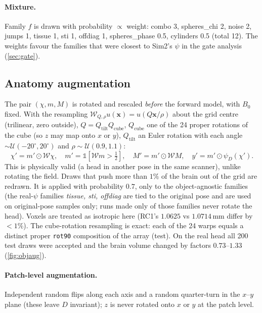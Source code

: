 \documentclass[11pt]{article}
\newcommand{\bx}{\bm{x}}
\newcommand{\ind}{\mathds{1}}
\newcommand{\code}[1]{\texttt{#1}}
\theoremstyle{remark}
\begin{document}
\paragraph{Mixture.} Family $f$ is drawn with probability $\propto$ weight: combo 3, spheres\_chi 2, noise 2, jumps 1, tissue 1, sti 1, offdiag 1, spheres\_phase 0.5, cylinders 0.5 (total 12). The weights favour the families that were closest to Sim2's $\psi$ in the gate analysis (\cref{sec:gate}).

\subsection{Anatomy augmentation}\label{sec:object}
The pair $(\chi,m,M)$ is rotated and rescaled \emph{before} the forward model, with $B_0$ fixed. With the resampling $\mathcal W_{Q,\rho}u(\bx)=u(Q\bx/\rho)$ about the grid centre (trilinear, zero outside), $Q=Q_{\mathrm{tilt}}Q_{\mathrm{cube}}$, $Q_{\mathrm{cube}}$ one of the 24 proper rotations of the cube (so $z$ may map onto $x$ or $y$),
$Q_{\mathrm{tilt}}$ an Euler rotation with each angle $\sim\mathcal U(-20^\circ,20^\circ)$ and $\rho\sim\mathcal U(0.9,1.1)$:
\[
\chi'=m'\odot\mathcal W\chi,\quad m'=\ind[\mathcal Wm>\tfrac12],\quad M'=m'\odot\mathcal WM,\quad y'=m'\odot\psi_D(\chi').
\]
This is physically valid (a head in another pose in the same scanner), unlike rotating the field. Draws that push more than $1\%$ of the brain out of the grid are redrawn. It is applied with probability $0.7$, only to the object-agnostic families (the real-$\psi$ families
\emph{tissue, sti, offdiag} are tied to the original pose and are used on original-pose samples only; runs made only of those families never rotate the head). Voxels are treated as isotropic here (RC1's $1.0625$ vs $1.0714$\,mm differ by $<1\%$).
The cube-rotation resampling is exact: each of the 24 warps equals a distinct proper \code{rot90} composition of the array (test). On the real head all 200 test draws were accepted and the brain volume changed by factors $0.73$--$1.33$ (\cref{fig:objaug}).

\paragraph{Patch-level augmentation.} Independent random flips along each axis and a random quarter-turn in the $x$--$y$ plane (these leave $D$ invariant); $z$ is never rotated onto $x$ or $y$ at the patch level.
\end{document}
